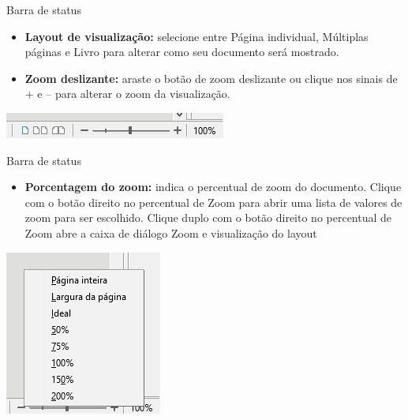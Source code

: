 \begin{frame}{Barra de status}
	\begin{block}{}
		\begin{itemize}
			\item \textbf{Layout de visualização:} selecione entre Página individual, Múltiplas páginas e Livro para alterar como seu documento será mostrado.
			\item \textbf{Zoom deslizante:} araste o botão de zoom deslizante ou clique nos sinais de + e – para alterar o zoom da visualização.
		\end{itemize}
	\end{block}

	\bigskip

	\centering
	\includegraphics[width=1\linewidth]{Figuras/Ch04/fig23}
\end{frame}


\begin{frame}{Barra de status}
	\begin{block}{}
		\begin{itemize}
			\item \textbf{Porcentagem do zoom:} indica o percentual de zoom do documento. Clique com o botão direito no percentual de Zoom para abrir uma lista de valores de zoom para ser escolhido. Clique duplo com o botão direito no percentual de Zoom abre a caixa de diálogo Zoom e visualização do layout
		\end{itemize}
	\end{block}

	\centering
	\includegraphics[width=0.4\linewidth]{Figuras/Ch04/fig24}
\end{frame}



